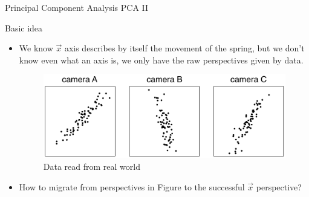 \documentclass[xcolor=x11names,compress,10pt]{beamer}
\renewcommand{\(}{\begin{columns}}
\renewcommand{\)}{\end{columns}}
\newcommand{\<}[1]{\begin{column}{#1}}
\renewcommand{\>}{\end{column}}
\begin{document}
\begin{frame}{Principal Component Analysis PCA II}
\begin{block}{Basic idea}
\begin{itemize}
	\item We know $\overrightarrow{x}$ axis describes by itself the movement of the spring, but we don't know even what an axis is, we only have the raw perspectives given by data.
	\begin{figure}
	\centering
	\includegraphics[scale=0.2]{../report/resources/images/camaras}
	\caption{Data read from real world}
	\label{fig:figure2}
\end{figure}
	\item How to migrate from perspectives in Figure to the successful $\overrightarrow{x}$ perspective?
\end{itemize}
\end{block}
\end{frame}
\end{document}
